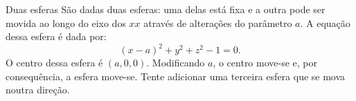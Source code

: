 \begin{surferPage}{Duas esferas}
S\~ao dadas duas esferas: uma delas est\'a fixa e a outra pode ser movida ao longo do eixo dos $xx$ atrav\'es de altera\c c\~oes do par\^ametro $a$.
A equa\c c\~ao dessa esfera \'e dada por:
\[(x-a)^2+y^2+z^2-1=0.\]
O centro dessa esfera \'e $(a,0,0)$. Modificando $a$, o centro  move-se e, por consequ\^encia, a esfera move-se.
Tente adicionar uma terceira esfera que se mova noutra dire\c c\~ao.
\end{surferPage}
